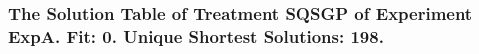  \begin{frame}
 \fontsize{8pt}{9pt}\selectfont
 \frametitle{ The Solution Table of Treatment SQSGP of Experiment ExpA. Fit: 0. Unique Shortest Solutions: 198. }

 \label{ExpASolutionTable004.tex}  
 \end{frame}


